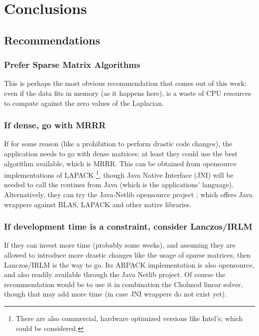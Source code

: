 \chapter{Conclusions}
\label{cha:conclu}

\section{Recommendations}

\subsection{Prefer Sparse Matrix Algorithms}

This is perhaps the most obvious recommendation that comes out of this
work: even if the data fits in memory (as it happens here), is a waste
of CPU resources to compute against the zero values of the \gls{Laplacian}.

\subsection{If dense, go with \gls{MRRR}}

If for some reason (like a prohibition to perform drastic code
changes), the application needs to go with dense matrices; at least
they could use the best algorithm available, which is \gls{MRRR}. This can
be obtained from opensource implementations of LAPACK \footnote{There
  are also commercial, hardware optimized versions like Intel's; which
  could be considered.}, though Java
Native Interface (JNI) will be needed to call the routines from Java (which
is the applications' language). Alternatively, they can try the
Java-Netlib opensource project \cite{jnetlib}; which offers Java
wrappers against BLAS, LAPACK and other native libraries.

\subsection{If development time is a constraint, consider Lanczos/\gls{IRLM}}

If they can invest more time (probably some weeks), and assuming
they are allowed to introduce more drastic changes like the usage of
sparse matrices, then Lanczos/\gls{IRLM} is the way to go. Its ARPACK
implementation is also opensource, and also readily available through
the Java Netlib project. Of course the recommendation would be to use
it in combination
the \gls{Cholmod} linear solver, though that may add more time (in case JNI
wrappers do not exist yet).

